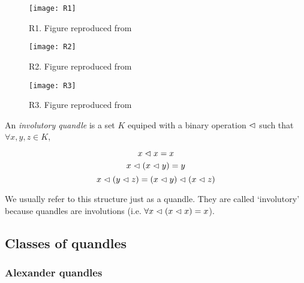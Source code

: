 \documentclass[paper.tex]{subfiles}
\begin{document}
\begin{figure}[h]
  \centering
  \texttt{[image: R1]}
  \caption{R1. Figure reproduced from~\cite{Cusick}}\label{fig:r1}
\end{figure}

\begin{figure}[h]
  \centering
  \texttt{[image: R2]}
  \caption{R2. Figure reproduced from~\cite{Cusick}}\label{fig:r2}
\end{figure}

\begin{figure}[h]
  \centering
  \texttt{[image: R3]}
  \caption{R3. Figure reproduced from~\cite{Cusick}}\label{fig:r3}
\end{figure}






\begin{definition}
An \emph{involutory quandle} is a set $K$ equiped with a binary operation $\vartriangleleft$ such that $\forall x,y,z \in K$,

\begin{equation}
	x \vartriangleleft x = x
\end{equation}
\begin{equation}
	x \vartriangleleft (x \vartriangleleft y) = y \\
\end{equation}
\begin{equation}
	x \vartriangleleft (y \vartriangleleft z) = (x \vartriangleleft y) \vartriangleleft (x \vartriangleleft z) \\
\end{equation}

We usually refer to this structure just as a quandle. They are called `involutory' because quandles are involutions (i.e. $\forall x \vartriangleleft (x \vartriangleleft x) = x$).

\end{definition}


\subsection{Classes of quandles}

\subsubsection{Alexander quandles}
\end{document}
